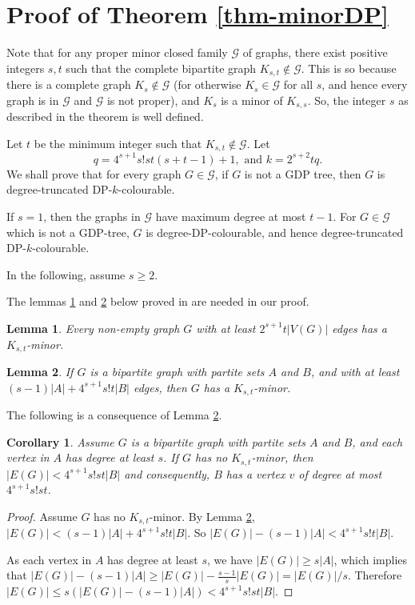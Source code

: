 \documentclass[11pt,a4paper]{article}
\newtheorem{lem}{Lemma}
\newtheorem{cor}{Corollary}
\theoremstyle{definition}
\begin{document}
\section{Proof of Theorem \ref{thm-minorDP}}


Note that for any proper minor closed family $\mathcal{G}$ of graphs, there exist positive integers $s,t$ such that the complete bipartite graph $K_{s,t} \notin \mathcal{G}$. This is so because there is a complete graph $K_s \notin \mathcal{G}$ (for otherwise $K_s \in \mathcal{G}$ for all $s$, and hence every graph is in $\mathcal{G}$ and $\mathcal{G}$ is not proper), and $K_s$ is a minor of $K_{s,s}$. So, the integer $s$ as described in the theorem is well defined. 

Let $t$ be the minimum integer such that $K_{s,t} \notin \mathcal{G}$. 
Let $$q = 4^{s+1}s! st (s+t-1)+1, \text{ and }  k=2^{s+2}tq.$$ We shall prove that for every graph $G \in \mathcal{G}$, if $G$ is not a GDP tree, then $G$ is degree-truncated DP-$k$-colourable. 


If $s=1$, then the graphs in $\mathcal{G}$ have maximum degree at most $t-1$.  For $G \in \mathcal{G}$ which is not a GDP-tree, $G$ is  degree-DP-colourable, and hence degree-truncated DP-$k$-colourable.

In the following, assume $s \ge 2$.
    
 

The lemmas \ref{lem-1b} and \ref{lem-2} below proved in \cite{Thomason} are needed in our proof.

\begin{lem}
	\label{lem-1b} Every non-empty graph $G$ with at least $2^{s+1}t|V(G)|$ edges has a %
	 $K_{s,t}$-minor.
\end{lem}	 

 

\begin{lem}
	\label{lem-2}
If $G$ is a bipartite graph with partite sets $A$ and $B$, and with at least $(s-1)|A|+4^{s+1}s!t|B|$ edges, then $G$ has a $K_{s,t}$-minor.
\end{lem}

The following is a consequence of Lemma \ref{lem-2}.

\begin{cor}
	\label{cor-1}
	Assume $G$ is a bipartite graph with partite sets $A$ and $B$, and each vertex in $A$ has degree at least $s$. If $G$ has no $K_{s,t}$-minor, then $|E(G)| < 4^{s+1}s! st|B|$ and consequently, $B$ has a vertex $v$ of degree at most $4^{s+1}s! st$.
\end{cor}
\begin{proof}
	Assume $G$ has no $K_{s,t}$-minor. By Lemma \ref{lem-2}, $|E(G)| < (s-1)|A|+4^{s+1}s!t|B|$. 
	So $|E(G)| - (s-1)|A| < 4^{s+1}s!t|B|$. 
	
	As each vertex in $A$ has degree at least $s$, we have $|E(G)| \ge s|A|$, which implies that $|E(G)| - (s-1)|A| \ge |E(G)|- \frac{s-1}{s}|E(G)| = |E(G)|/s$. Therefore 
	$|E(G)|  \le s (|E(G)| - (s-1)|A|) < 4^{s+1}s! st|B|$.
\end{proof}
		
\end{document}
